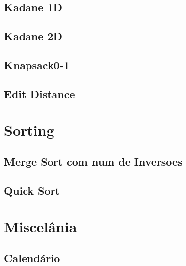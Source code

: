 \subsection{Kadane 1D}
\raggedbottom
\hrulefill
\subsection{Kadane 2D}
\raggedbottom
\hrulefill
\subsection{Knapsack0-1}
\raggedbottom
\hrulefill
\subsection{Edit Distance}
\raggedbottom
\hrulefill

\section{Sorting}
\subsection{Merge Sort com num de Inversoes}
\raggedbottom
\hrulefill
\subsection{Quick Sort}
\raggedbottom
\hrulefill

\section{Miscelânia}
\subsection{Calendário}
\raggedbottom
\hrulefill

